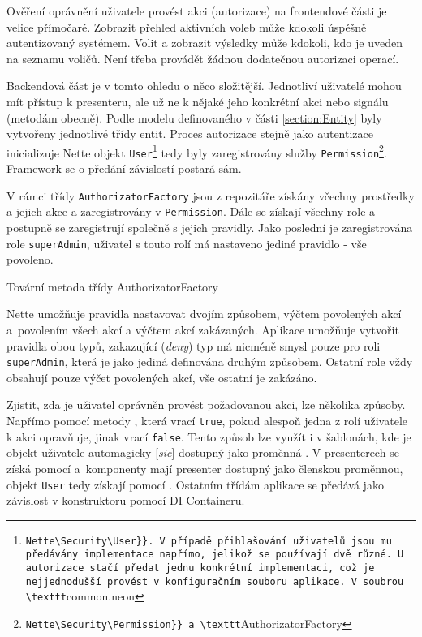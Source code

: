 Ověření oprávnění uživatele provést akci (autorizace) na frontendové části je velice přímočaré. Zobrazit přehled aktivních voleb může kdokoli úspěšně autentizovaný systémem. Volit a zobrazit výsledky může kdokoli, kdo je uveden na seznamu voličů. Není třeba provádět žádnou dodatečnou autorizaci operací.

Backendová část je v tomto ohledu o něco složitější. Jednotliví uživatelé mohou mít přístup k presenteru, ale už ne k nějaké jeho konkrétní akci nebo signálu (metodám obecně). Podle modelu definovaného v části \ref{section:Entity} byly vytvořeny jednotlivé třídy entit. Proces autorizace stejně jako autentizace inicializuje Nette objekt \texttt{User}\footnote{\label{user}\Verb{Nette\Security\User}}. V případě přihlašování uživatelů jsou mu předávány implementace napřímo, jelikož se používají dvě různé. U autorizace stačí předat jednu konkrétní implementaci, což je nejjednodušší provést v konfiguračním souboru aplikace. V soubrou \texttt{common.neon} tedy byly zaregistrovány služby \texttt{Permission}\footnote{\Verb{Nette\Security\Permission}} a \texttt{AuthorizatorFactory}. Framework se o předání závislostí postará sám.

V rámci třídy \texttt{AuthorizatorFactory} jsou z repozitáře získány včechny prostředky a jejich akce a zaregistrovány v \texttt{Permission}. Dále se získají všechny role a postupně se zaregistrují společně s jejich pravidly. Jako poslední je zaregistrována role \texttt{superAdmin}, uživatel s touto rolí má nastaveno jediné pravidlo - vše povoleno. 

\begin{listing}[ht]
\caption{Tovární metoda třídy AuthorizatorFactory}
\label{php:autorizace}
\end{listing}

Nette umožňuje pravidla nastavovat dvojím způsobem, výčtem povolených akcí a~povolením všech akcí a výčtem akcí zakázaných. Aplikace umožňuje vytvořit pravidla obou typů, zakazující (\textit{deny}) typ má nicméně smysl pouze pro roli \texttt{superAdmin}, která je jako jediná definována druhým způsobem. Ostatní role vždy obsahují pouze výčet povolených akcí, vše ostatní je zakázáno.

Zjistit, zda je uživatel oprávněn provést požadovanou akci, lze několika způsoby. Napřímo pomocí metody , která vrací \texttt{true}, pokud alespoň jedna z rolí uživatele k akci opravňuje, jinak vrací \texttt{false}. Tento způsob lze využít i v šablonách, kde je objekt uživatele automagicky [\textit{sic}] dostupný jako proměnná %
. V presenterech se získá pomocí  %
 a~komponenty mají presenter dostupný jako členskou proměnnou, objekt \texttt{User} tedy získají pomocí %
. Ostatním třídám aplikace se předává jako závislost v konstruktoru pomocí DI Containeru.

